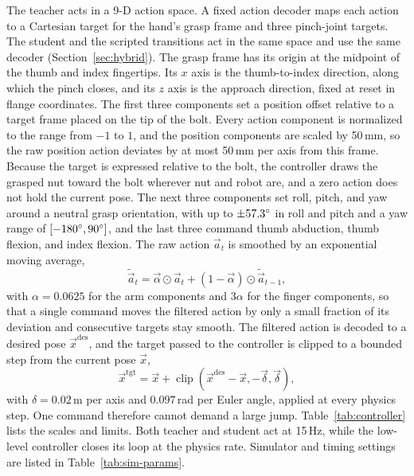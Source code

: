 The teacher acts in a 9-D action space. A fixed action decoder maps each action to a Cartesian target for the hand's grasp frame and three pinch-joint targets. The student and the scripted transitions act in the same space and use the same decoder (Section~\ref{sec:hybrid}). The grasp frame has its origin at the midpoint of the thumb and index fingertips. Its $x$ axis is the thumb-to-index direction, along which the pinch closes, and its $z$ axis is the approach direction, fixed at reset in flange coordinates. The first three components set a position offset relative to a target frame placed on the tip of the bolt. Every action component is normalized to the range from $-1$ to $1$, and the position components are scaled by 50\,mm, so the raw position action deviates by at most 50\,mm per axis from this frame. Because the target is expressed relative to the bolt, the controller draws the grasped nut toward the bolt wherever nut and robot are, and a zero action does not hold the current pose. The next three components set roll, pitch, and yaw around a neutral grasp orientation, with up to $\pm57.3^\circ$ in roll and pitch and a yaw range of $[-180^\circ,90^\circ]$, and the last three command thumb abduction, thumb flexion, and index flexion. The raw action $\vec{a}_t$ is smoothed by an exponential moving average,
\begin{equation}\label{eq:ema}
  \tilde{\vec{a}}_t=\vec{\alpha}\odot\vec{a}_t+(1-\vec{\alpha})\odot\tilde{\vec{a}}_{t-1},
\end{equation}
with $\alpha=0.0625$ for the arm components and $3\alpha$ for the finger components, so that a single command moves the filtered action by only a small fraction of its deviation and consecutive targets stay smooth. The filtered action is decoded to a desired pose $\vec{x}^{\mathrm{des}}$, and the target passed to the controller is clipped to a bounded step from the current pose $\vec{x}$,
\begin{equation}\label{eq:steplimit}
  \vec{x}^{\mathrm{tgt}}=\vec{x}+\operatorname{clip}\left(\vec{x}^{\mathrm{des}}-\vec{x},-\vec{\delta},\vec{\delta}\right),
\end{equation}
with $\delta=0.02$\,m per axis and $0.097$\,rad per Euler angle, applied at every physics step. One command therefore cannot demand a large jump. Table~\ref{tab:controller} lists the scales and limits. Both teacher and student act at 15\,Hz, while the low-level controller closes its loop at the physics rate. Simulator and timing settings are listed in Table~\ref{tab:sim-params}.

